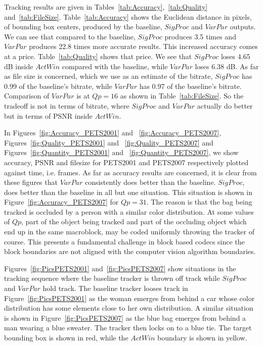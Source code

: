 \documentclass{article}
\begin{document}
Tracking results are given in Tables~\ref{tab:Accuracy},~\ref{tab:Quality} and~\ref{tab:FileSize}.  Table~\ref{tab:Accuracy} shows the Euclidean distance in pixels, of bounding box centers, produced by the baseline, $SigProc$ and $VarPar$ outputs.  We can see that compared to the baseline, $SigProc$ produces 3.5 times and $VarPar$ produces 22.8 times more accurate results.  This increased accuracy comes at a price.  Table~\ref{tab:Quality} shows that price.  We see that $SigProc$ loses 4.65 dB inside $ActWin$ compared with the baseline, while $VarPar$ loses 6.38 dB.  As far as file size is concerned, which we use as an estimate of the bitrate, $SigProc$ has 0.99 of the baseline's bitrate, while $VarPar$ has 0.97 of the baseline's bitrate.  Comparison of $VarPar$ is at $Qp=16$ as shown in Table~\ref{tab:FileSize}.  So the tradeoff is not in terms of bitrate, where $SigProc$ and $VarPar$ actually do better but in terms of PSNR inside $ActWin$. 
 
In Figures~\ref{fig:Accuracy_PETS2001} and ~\ref{fig:Accuracy_PETS2007}, Figures~\ref{fig:Quality_PETS2001} and ~\ref{fig:Quality_PETS2007} and Figures~\ref{fig:Quantity_PETS2001} and ~\ref{fig:Quantity_PETS2007}, we show accuracy, PSNR and filesize for PETS2001 and PETS2007 respectively plotted against time, i.e. frames.  As far as accuracy results are concerned, it is clear from these figures that $VarPar$ consistently does better than the baseline.  $SigProc$, does better than the baseline in all but one situation.  This situation is shown in Figure~\ref{fig:Accuracy_PETS2007} for $Qp=31$.  The reason is that the bag being tracked is occluded by a person with a similar color distribution.  At some values of $Qp$, part of the object being tracked and part of the occluding object which end up in the same macroblock, may be coded uniformly throwing the tracker of course.  This presents a fundamental challenge in block based codecs since the block boundaries are not aligned with the computer vision algorithm boundaries.

Figures~\ref{fig:PicsPETS2001} and~\ref{fig:PicsPETS2007} show situations in the tracking sequence where the baseline tracker is thrown off track while $SigProc$ and $VarPar$ hold track.  The baseline tracker looses track in Figure~\ref{fig:PicsPETS2001} as the woman emerges from behind a car whose color distribution has some elements close to her own distribution.  A similar situation is shown in Figure~\ref{fig:PicsPETS2007} as the blue bag emerges from behind a man wearing a blue sweater.  The tracker then locks on to a blue tie.  The target bounding box is shown in red, while the $ActWin$ boundary is shown in yellow.  
\end{document}
